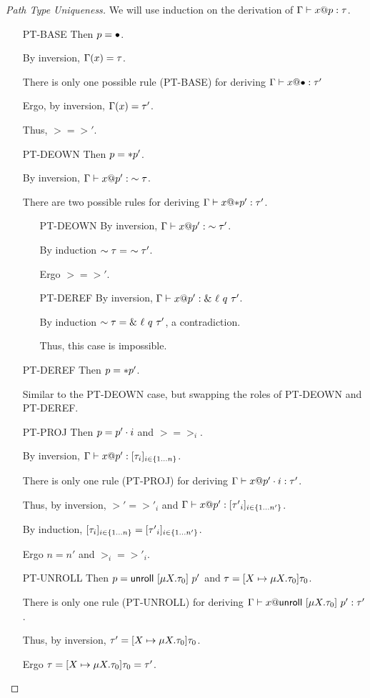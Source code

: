 \begin{proof}[Path Type Uniqueness]
  We will use induction on the derivation of ${\Gamma} \vdash {{x}@{p}} : {\tau}$.
  \begin{itemize}
    \item[\textsc{PT-BASE}] Then $p = \bullet$.

      By inversion, $\Gamma(x)=\tau$.
      
      There is only one possible rule (\textsc{PT-BASE}) for 
      deriving ${\Gamma} \vdash {{x}@{\bullet}} : {\tau'}$ 
      
      Ergo, by inversion, $\Gamma(x)=\tau'$.

      Thus, $\gt = \gt'$.
    \item[\textsc{PT-DEOWN}] Then $p = *{p'}$.

      By inversion, ${\Gamma} \vdash {{x}@{p'}} : {\sim{\tau}}$.

      There are two possible rules for deriving ${\Gamma} \vdash {{x}@{*{p'}}} : {\tau'}$.
      \begin{itemize}
	\item[\textsc{PT-DEOWN}]
	  By inversion, ${\Gamma} \vdash {{x}@{p'}} : {\sim{\tau'}}$.

	  By induction $\own{\gt} =\ \own{\gt'}$.

	  Ergo $\gt = \gt'$.
	\item[\textsc{PT-DEREF}]
	  By inversion, ${\Gamma} \vdash {{x}@{p'}} : {\&~{{\ell}~{q}~{\tau'}}}$.

	  By induction $\sim{\tau} = \&~{{\ell}~{q}~{\tau'}}$, a contradiction.

	  Thus, this case is impossible.
      \end{itemize}
    \item[\textsc{PT-DEREF}] Then $p = *{p'}$.

      Similar to the \textsc{PT-DEOWN} case, 
      but swapping the roles of \textsc{PT-DEOWN} and \textsc{PT-DEREF}.
    \item[\textsc{PT-PROJ}] Then $p = {p'}\cdot{i}$ and $\gt = \gt_i$.

      By inversion, ${\Gamma} \vdash {{x}@{p'}} : {[{{\tau}_{i}}]_{{i} \in \{1 \ldots {n}\} }}$.

      There is only one rule (\textsc{PT-PROJ}) for deriving ${\Gamma} \vdash {{x}@{{p'}\cdot{i}}} : {\tau'}$.

      Thus, by inversion, $\gt' = \gt'_i$ and ${\Gamma} \vdash {{x}@{p'}} : {[{{\tau'}_{i}}]_{{i} \in \{1 \ldots {n'}\} }}$.

      By induction, $[{{\tau}_{i}}]_{{i} \in \{1 \ldots {n}\} } = [{{\tau'}_{i}}]_{{i} \in \{1 \ldots {n'}\} }$.

      Ergo $n = n'$ and $\gt_i = \gt'_i$.
    \item[\textsc{PT-UNROLL}] 
      Then $p = \mathsf{unroll}~[{\mu {X}.{\tau_0}}]~{p'}$ and $\tau = [{X} \mapsto {\mu {X}.{\tau_0}}] {\tau_0}$.

      There is only one rule (\textsc{PT-UNROLL}) for deriving
      ${\Gamma} \vdash {{x}@{\mathsf{unroll}~[{\mu {X}.{\tau_0}}]~{p'}}} : {\tau'}$.

      Thus, by inversion, $\tau' = [{X} \mapsto {\mu {X}.{\tau_0}}] {\tau_0}$.

      Ergo $\tau = [{X} \mapsto {\mu {X}.{\tau_0}}] {\tau_0} = \tau'$.
  \end{itemize}
\end{proof}

